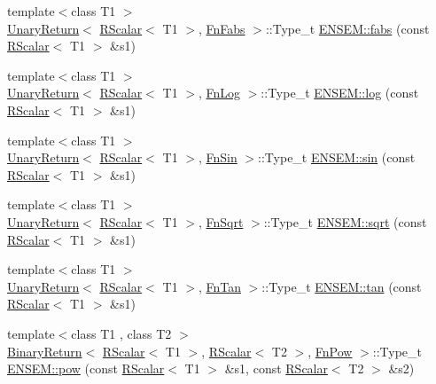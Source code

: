 \begin{DoxyCompactItemize}
\item 
{\footnotesize template$<$class T1 $>$ }\\\mbox{\hyperlink{structENSEM_1_1UnaryReturn}{Unary\+Return}}$<$ \mbox{\hyperlink{classENSEM_1_1RScalar}{R\+Scalar}}$<$ T1 $>$, \mbox{\hyperlink{structENSEM_1_1FnFabs}{Fn\+Fabs}} $>$\+::Type\+\_\+t \mbox{\hyperlink{group__rscalar_ga4f8b1e156677c7d98bb51e70915b9239}{E\+N\+S\+E\+M\+::fabs}} (const \mbox{\hyperlink{classENSEM_1_1RScalar}{R\+Scalar}}$<$ T1 $>$ \&s1)
\item 
{\footnotesize template$<$class T1 $>$ }\\\mbox{\hyperlink{structENSEM_1_1UnaryReturn}{Unary\+Return}}$<$ \mbox{\hyperlink{classENSEM_1_1RScalar}{R\+Scalar}}$<$ T1 $>$, \mbox{\hyperlink{structENSEM_1_1FnLog}{Fn\+Log}} $>$\+::Type\+\_\+t \mbox{\hyperlink{group__rscalar_gacf4bc45f226554e38012a20a649605ed}{E\+N\+S\+E\+M\+::log}} (const \mbox{\hyperlink{classENSEM_1_1RScalar}{R\+Scalar}}$<$ T1 $>$ \&s1)
\item 
{\footnotesize template$<$class T1 $>$ }\\\mbox{\hyperlink{structENSEM_1_1UnaryReturn}{Unary\+Return}}$<$ \mbox{\hyperlink{classENSEM_1_1RScalar}{R\+Scalar}}$<$ T1 $>$, \mbox{\hyperlink{structENSEM_1_1FnSin}{Fn\+Sin}} $>$\+::Type\+\_\+t \mbox{\hyperlink{group__rscalar_ga60f574c6e8f0da11360b8c41c46490a5}{E\+N\+S\+E\+M\+::sin}} (const \mbox{\hyperlink{classENSEM_1_1RScalar}{R\+Scalar}}$<$ T1 $>$ \&s1)
\item 
{\footnotesize template$<$class T1 $>$ }\\\mbox{\hyperlink{structENSEM_1_1UnaryReturn}{Unary\+Return}}$<$ \mbox{\hyperlink{classENSEM_1_1RScalar}{R\+Scalar}}$<$ T1 $>$, \mbox{\hyperlink{structENSEM_1_1FnSqrt}{Fn\+Sqrt}} $>$\+::Type\+\_\+t \mbox{\hyperlink{group__rscalar_ga1f127fac0ef1cb032c7bd632657439bf}{E\+N\+S\+E\+M\+::sqrt}} (const \mbox{\hyperlink{classENSEM_1_1RScalar}{R\+Scalar}}$<$ T1 $>$ \&s1)
\item 
{\footnotesize template$<$class T1 $>$ }\\\mbox{\hyperlink{structENSEM_1_1UnaryReturn}{Unary\+Return}}$<$ \mbox{\hyperlink{classENSEM_1_1RScalar}{R\+Scalar}}$<$ T1 $>$, \mbox{\hyperlink{structENSEM_1_1FnTan}{Fn\+Tan}} $>$\+::Type\+\_\+t \mbox{\hyperlink{group__rscalar_ga84dc4a2763ad7c0adb4af839501c4c99}{E\+N\+S\+E\+M\+::tan}} (const \mbox{\hyperlink{classENSEM_1_1RScalar}{R\+Scalar}}$<$ T1 $>$ \&s1)
\item 
{\footnotesize template$<$class T1 , class T2 $>$ }\\\mbox{\hyperlink{structENSEM_1_1BinaryReturn}{Binary\+Return}}$<$ \mbox{\hyperlink{classENSEM_1_1RScalar}{R\+Scalar}}$<$ T1 $>$, \mbox{\hyperlink{classENSEM_1_1RScalar}{R\+Scalar}}$<$ T2 $>$, \mbox{\hyperlink{structENSEM_1_1FnPow}{Fn\+Pow}} $>$\+::Type\+\_\+t \mbox{\hyperlink{group__rscalar_gae9777be3e406f64a9a70f5a97526102a}{E\+N\+S\+E\+M\+::pow}} (const \mbox{\hyperlink{classENSEM_1_1RScalar}{R\+Scalar}}$<$ T1 $>$ \&s1, const \mbox{\hyperlink{classENSEM_1_1RScalar}{R\+Scalar}}$<$ T2 $>$ \&s2)

\end{DoxyCompactItemize}
